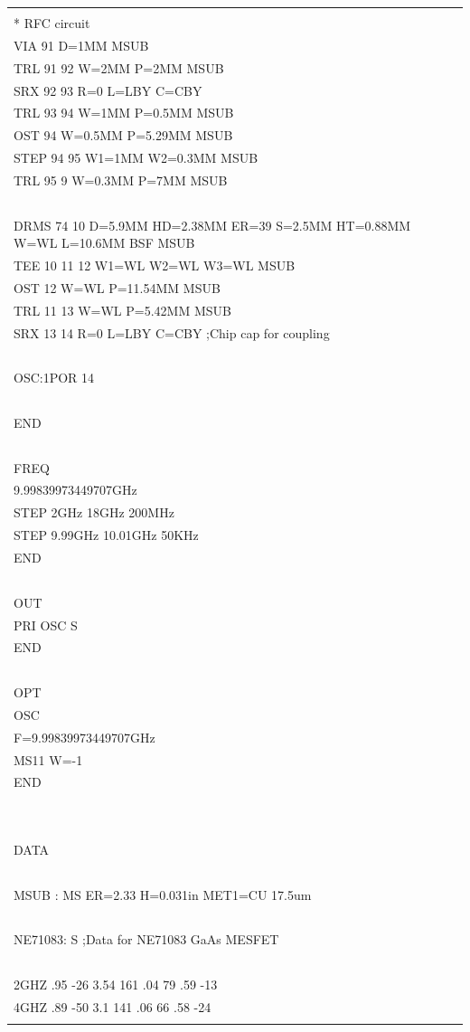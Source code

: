 \begin{longtable}[]{@{}l@{}}
\begin{minipage}[t]{0.97\columnwidth}
\begin{quote}
~\\
* RFC circuit\\
VIA 91 D=1MM MSUB\\
TRL 91 92 W=2MM P=2MM MSUB\\
SRX 92 93 R=0 L=LBY C=CBY\\
TRL 93 94 W=1MM P=0.5MM MSUB\\
OST 94 W=0.5MM P=5.29MM MSUB\\
STEP 94 95 W1=1MM W2=0.3MM MSUB\\
TRL 95 9 W=0.3MM P=7MM MSUB\\
~\\
DRMS 74 10 D=5.9MM HD=2.38MM ER=39 S=2.5MM HT=0.88MM W=WL L=10.6MM BSF
MSUB\\
TEE 10 11 12 W1=WL W2=WL W3=WL MSUB\\
OST 12 W=WL P=11.54MM MSUB\\
TRL 11 13 W=WL P=5.42MM MSUB\\
SRX 13 14 R=0 L=LBY C=CBY ;Chip cap for coupling\\
~\\
OSC:1POR 14\\
~\\
END\\
~\\
FREQ\\
9.99839973449707GHz\\
STEP 2GHz 18GHz 200MHz\\
STEP 9.99GHz 10.01GHz 50KHz\\
END\\
~\\
OUT\\
PRI OSC S\\
END\\
~\\
OPT\\
OSC\\
F=9.99839973449707GHz\\
MS11 W=-1\\
END\\
~\\
~\\
DATA\\
~\\
MSUB : MS ER=2.33 H=0.031in MET1=CU 17.5um\\
~\\
NE71083: S ;Data for NE71083 GaAs MESFET\\
~\\
2GHZ .95 -26 3.54 161 .04 79 .59 -13\\
4GHZ .89 -50 3.1 141 .06 66 .58 -24\\

\end{quote}
\end{minipage}
\end{longtable}
